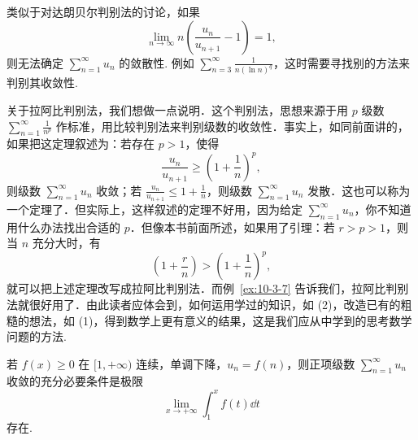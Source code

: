 类似于对达朗贝尔判别法的讨论，如果
\[
\lim_{n\to\infty}n\left(\frac{u_{n}}{u_{n+1}}-1\right)=1,
\]
则无法确定 $\sum_{n=1}^{\infty}u_{n}$ 的敛散性. 例如 $\sum_{n=3}^{\infty}\frac{1}{n(\ln n)^{q}}$，这时需要寻找别的方法来判别其收敛性.

关于拉阿比判别法，我们想做一点说明．这个判别法，思想来源于用 $p$ 级数 $\sum_{n=1}^{\infty}\frac{1}{n^{p}}$ 作标准，用比较判别法来判别级数的收敛性．事实上，如同前面讲的，如果把这定理叙述为：若存在 $p>1$，使得
\begin{equation}
\frac{u_{n}}{u_{n+1}}\geqslant\left(1+\frac{1}{n}\right)^{p},
\tag{1}
\end{equation}
则级数 $\sum_{n=1}^{\infty}u_{n}$ 收敛；若 $\frac{u_{n}}{u_{n+1}}\leq1+\frac{1}{n}$，则级数 $\sum_{n=1}^{\infty}u_{n}$ 发散．这也可以称为一个定理了．但实际上，这样叙述的定理不好用，因为给定 $\sum_{n=1}^{\infty}u_{n}$，你不知道用什么办法找出合适的 $p$．但像本书前面所述，如果用了引理：若 $r>p>1$，则当 $n$ 充分大时，有
\begin{equation}
\left(1+\frac{r}{n}\right)>\left(1+\frac{1}{n}\right)^{p},
\tag{2}
\end{equation}
就可以把上述定理改写成拉阿比判别法．而例~\ref{ex:10-3-7} 告诉我们，拉阿比判别法就很好用了．由此读者应体会到，如何运用学过的知识，如 (2)，改造已有的粗糙的想法，如 (1)，得到数学上更有意义的结果，这是我们应从中学到的思考数学问题的方法.

\begin{theorem}[柯西积分判别法]\label{thm:10-12}
若 $f(x)\geq0$ 在 $[1,+\infty)$ 连续，单调下降，$u_{n}=f(n)$，则正项级数 $\sum_{n=1}^{\infty}u_{n}$ 收敛的充分必要条件是极限
\[
\lim_{x\to+\infty}\int_{1}^{x}f(t)\dd t
\]
存在.
\end{theorem}


